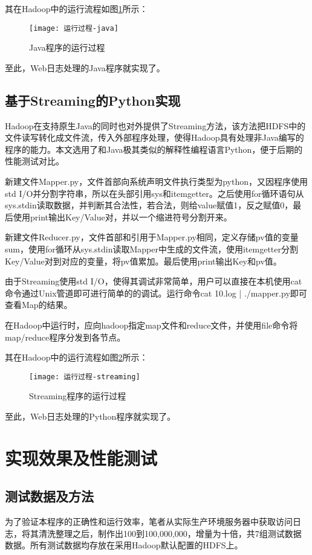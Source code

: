 其在Hadoop中的运行流程如图\ref{fig:运行过程-java}所示：

\begin{figure}[h]
 \centering
 \texttt{[image: 运行过程-java]}
 \caption{Java程序的运行过程}
 \label{fig:运行过程-java}
\end{figure}

至此，Web日志处理的Java程序就实现了。

\subsection{基于Streaming的Python实现}
Hadoop在支持原生Java的同时也对外提供了Streaming方法，该方法把HDFS中的文件读写转化成文件流，传入外部程序处理，使得Hadoop具有处理非Java编写的程序的能力。本文选用了和Java极其类似的解释性编程语言Python，便于后期的性能测试对比。

新建文件Mapper.py，文件首部向系统声明文件执行类型为python，又因程序使用std I/O并分割字符串，所以在头部引用sys和itemgetter。之后使用for循环语句从sys.stdin读取数据，并判断其合法性，若合法，则给value赋值1，反之赋值0，最后使用print输出Key/Value对，并以一个缩进符号分割开来。

新建文件Reducer.py，文件首部和引用于Mapper.py相同，定义存储pv值的变量sum，使用for循环从sys.stdin读取Mapper中生成的文件流，使用itemgetter分割Key/Value对到对应的变量，将pv值累加。最后使用print输出Key和pv值。

由于Streaming使用std I/O，使得其调试非常简单，用户可以直接在本机使用cat命令通过Unix管道即可进行简单的的调试。运行命令cat 10.log | ./mapper.py即可查看Map的结果。

在Hadoop中运行时，应向hadoop指定map文件和reduce文件，并使用file命令将map/reduce程序分发到各节点。

其在Hadoop中的运行流程如图\ref{fig:运行过程-streaming}所示：

\begin{figure}[!h]
 \centering
 \texttt{[image: 运行过程-streaming]}
 \caption{Streaming程序的运行过程}
 \label{fig:运行过程-streaming}
\end{figure}


至此，Web日志处理的Python程序就实现了。

\section{实现效果及性能测试}
\subsection{测试数据及方法}
为了验证本程序的正确性和运行效率，笔者从实际生产环境服务器中获取访问日志，将其清洗整理之后，制作出100到100,000,000，增量为十倍，共7组测试数据数据。所有测试数据均存放在采用Hadoop默认配置的HDFS上。

